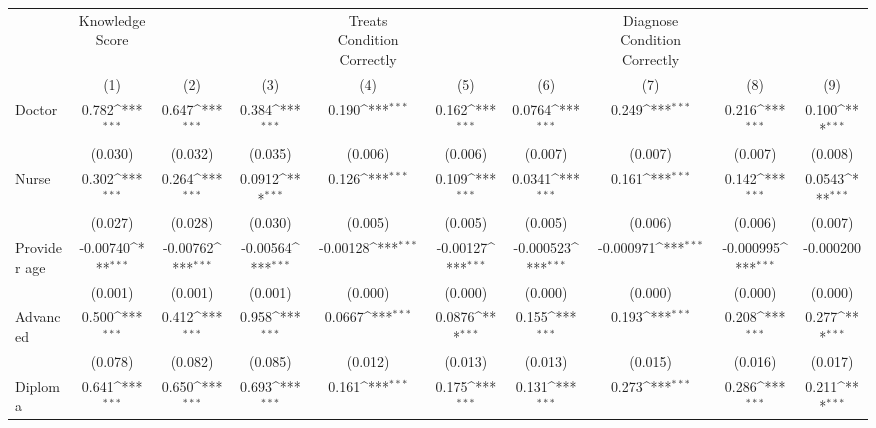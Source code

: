 {
\def\sym#1{\ifmmode^{#1}\else\(^{#1}\)\fi}
\begin{tabular}{l*{9}{c}}
\hline\hline
                &Knowledge Score         &                  &                  &Treats Condition Correctly         &                  &                  &Diagnose Condition Correctly         &                  &                  \\
                &\multicolumn{1}{c}{(1)}         &\multicolumn{1}{c}{(2)}         &\multicolumn{1}{c}{(3)}         &\multicolumn{1}{c}{(4)}         &\multicolumn{1}{c}{(5)}         &\multicolumn{1}{c}{(6)}         &\multicolumn{1}{c}{(7)}         &\multicolumn{1}{c}{(8)}         &\multicolumn{1}{c}{(9)}         \\
\hline
Doctor          &    0.782\sym{***}&    0.647\sym{***}&    0.384\sym{***}&    0.190\sym{***}&    0.162\sym{***}&   0.0764\sym{***}&    0.249\sym{***}&    0.216\sym{***}&    0.100\sym{***}\\
                &  (0.030)         &  (0.032)         &  (0.035)         &  (0.006)         &  (0.006)         &  (0.007)         &  (0.007)         &  (0.007)         &  (0.008)         \\
Nurse           &    0.302\sym{***}&    0.264\sym{***}&   0.0912\sym{***}&    0.126\sym{***}&    0.109\sym{***}&   0.0341\sym{***}&    0.161\sym{***}&    0.142\sym{***}&   0.0543\sym{***}\\
                &  (0.027)         &  (0.028)         &  (0.030)         &  (0.005)         &  (0.005)         &  (0.005)         &  (0.006)         &  (0.006)         &  (0.007)         \\
Provider age    & -0.00740\sym{***}& -0.00762\sym{***}& -0.00564\sym{***}& -0.00128\sym{***}& -0.00127\sym{***}&-0.000523\sym{***}&-0.000971\sym{***}&-0.000995\sym{***}&-0.000200         \\
                &  (0.001)         &  (0.001)         &  (0.001)         &  (0.000)         &  (0.000)         &  (0.000)         &  (0.000)         &  (0.000)         &  (0.000)         \\
Advanced        &    0.500\sym{***}&    0.412\sym{***}&    0.958\sym{***}&   0.0667\sym{***}&   0.0876\sym{***}&    0.155\sym{***}&    0.193\sym{***}&    0.208\sym{***}&    0.277\sym{***}\\
                &  (0.078)         &  (0.082)         &  (0.085)         &  (0.012)         &  (0.013)         &  (0.013)         &  (0.015)         &  (0.016)         &  (0.017)         \\
Diploma         &    0.641\sym{***}&    0.650\sym{***}&    0.693\sym{***}&    0.161\sym{***}&    0.175\sym{***}&    0.131\sym{***}&    0.273\sym{***}&    0.286\sym{***}&    0.211\sym{***}\\

\end{tabular}}
